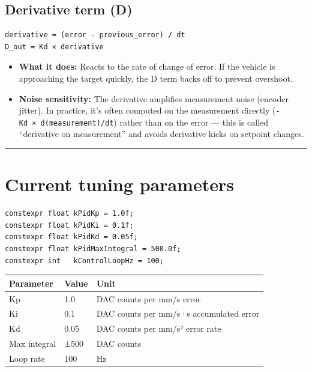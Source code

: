 \documentclass[12pt,a4paper,oneside]{report}
\providecommand{\tightlist}{\setlength{\itemsep}{0pt}\setlength{\parskip}{0pt}}
\begin{document}
\subsection{Derivative term (D)}\label{derivative-term-d}

\begin{verbatim}
derivative = (error - previous_error) / dt
D_out = Kd × derivative
\end{verbatim}

\begin{itemize}
\tightlist
\item
  \textbf{What it does:} Reacts to the rate of change of error. If the vehicle
  is approaching the target quickly, the D term backs off to prevent overshoot.
\item
  \textbf{Noise sensitivity:} The derivative amplifies measurement noise
  (encoder jitter). In practice, it's often computed on the measurement directly
  (\texttt{-Kd\ ×\ d(measurement)/dt}) rather than on the error --- this is
  called ``derivative on measurement'' and avoids derivative kicks on setpoint
  changes.
\end{itemize}

\begin{center}\rule{0.5\linewidth}{0.5pt}\end{center}

\section{Current tuning parameters}\label{current-tuning-parameters}

\begin{verbatim}
constexpr float kPidKp = 1.0f;
constexpr float kPidKi = 0.1f;
constexpr float kPidKd = 0.05f;
constexpr float kPidMaxIntegral = 500.0f;
constexpr int   kControlLoopHz = 100;
\end{verbatim}

\begin{longtable}[]{@{}lll@{}}
\toprule\noalign{}
Parameter & Value & Unit \\
\midrule\noalign{}
\endhead
\bottomrule\noalign{}
\endlastfoot
Kp & 1.0 & DAC counts per mm/s error \\
Ki & 0.1 & DAC counts per mm/s·s accumulated error \\
Kd & 0.05 & DAC counts per mm/s² error rate \\
Max integral & ±500 & DAC counts \\
Loop rate & 100 & Hz \\
\end{longtable}
\end{document}
